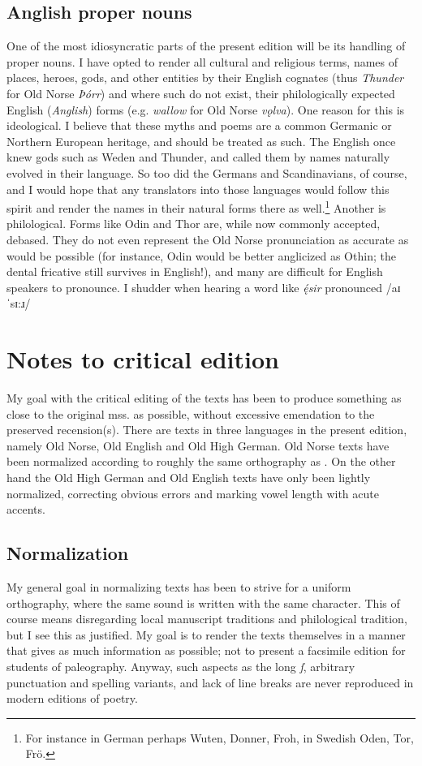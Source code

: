   \subsection{Anglish proper nouns}
    One of the most idiosyncratic parts of the present edition will be its handling of proper nouns. I have opted to render all cultural and religious terms, names of places, heroes, gods, and other entities by their English cognates (thus \emph{Thunder} for Old Norse \emph{Þórr}) and where such do not exist, their philologically expected English (\emph{Anglish}) forms (e.g. \emph{wallow} for Old Norse \emph{vǫlva}).
    One reason for this is ideological. I believe that these myths and poems are a common Germanic or Northern European heritage, and should be treated as such. The English once knew gods such as Weden and Thunder, and called them by names naturally evolved in their language. So too did the Germans and Scandinavians, of course, and I would hope that any translators into those languages would follow this spirit and render the names in their natural forms there as well.\footnote{For instance in German perhaps Wuten, Donner, Froh, in Swedish Oden, Tor, Frö.}
    Another is philological. Forms like Odin and Thor are, while now commonly accepted, debased. They do not even represent the Old Norse pronunciation as accurate as would be possible (for instance, Odin would be better anglicized as Othin; the dental fricative still survives in English!), and many are difficult for English speakers to pronounce. I shudder when hearing a word like \emph{ę́sir} pronounced /aɪˈsɪ:ɹ/

\section{Notes to critical edition}
  My goal with the critical editing of the texts has been to produce something as close to the original mss. as possible, without excessive emendation to the preserved recension(s). There are texts in three languages in the present edition, namely Old Norse, Old English and Old High German. Old Norse texts have been normalized according to roughly the same orthography as \textcite{FinnurEdda}. On the other hand the Old High German and Old English texts have only been lightly normalized, correcting obvious errors and marking vowel length with acute accents.

  \subsection{Normalization}
    My general goal in normalizing texts has been to strive for a uniform orthography, where the same sound is written with the same character. This of course means disregarding local manuscript traditions and philological tradition, but I see this as justified. My goal is to render the texts themselves in a manner that gives as much information as possible; not to present a facsimile edition for students of paleography. Anyway, such aspects as the long \emph{ſ}, arbitrary punctuation and spelling variants, and lack of line breaks are never reproduced in modern editions of poetry.

